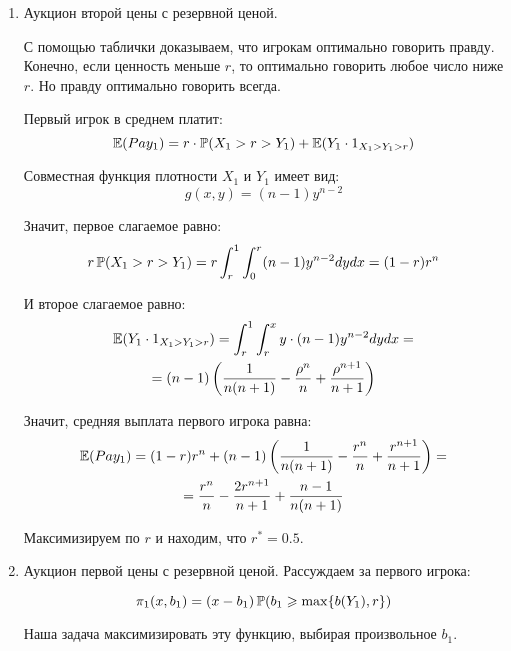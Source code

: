 \begin{enumerate}
\item Аукцион второй цены с резервной ценой.

С помощью таблички доказываем, что игрокам оптимально говорить правду. Конечно, если ценность меньше $ r $, то оптимально говорить любое число ниже $ r $. Но правду оптимально говорить всегда.

Первый игрок в среднем платит:
\begin{equation}
\E(Pay_{1})=r\cdot \P(X_{1}>r>Y_{1})+\E(Y_{1}\cdot 1_{X_{1}>Y_{1}>r})
\end{equation}

Совместная функция плотности $ X_{1} $ и $ Y_{1} $ имеет вид:
\begin{equation}
g(x,y)=(n-1)y^{n-2}
\end{equation}

Значит, первое слагаемое равно:
\begin{equation}
r\P(X_{1}>r>Y_{1})=r\int_{r}^{1}\int_{0}^{r} (n-1)y^{n-2} dy dx=(1-r)r^{n}
\end{equation}

И второе слагаемое равно:
\begin{multline} \label{E_Y_1XYr}
\E(Y_{1}\cdot 1_{X_{1}>Y_{1}>r})=\int_{r}^{1}\int_{r}^{x} y\cdot (n-1)y^{n-2} dy dx=\\
=(n-1)\left(\frac{1}{n(n+1)}-\frac{\rho^{n}}{n}+\frac{\rho^{n+1}}{n+1}\right)
\end{multline}

Значит, средняя выплата первого игрока равна:
\begin{multline}
\E(Pay_{1})=(1-r)r^{n}+(n-1)\left(\frac{1}{n(n+1)}-\frac{r^{n}}{n}+\frac{r^{n+1}}{n+1}\right)=\\
=\frac{r^{n}}{n}-\frac{2r^{n+1}}{n+1}+\frac{n-1}{n(n+1)}
\end{multline}

Максимизируем по $ r $ и находим, что $ r^{*}=0.5 $.


\item Аукцион первой цены с резервной ценой. Рассуждаем за первого игрока:

\begin{equation}
\pi_{1}(x,b_{1})=(x-b_{1})\P(b_{1}\geq \max\{b(Y_{1}),r\})
\end{equation}

Наша задача максимизировать эту функцию, выбирая произвольное $ b_{1} $.


\end{enumerate}
